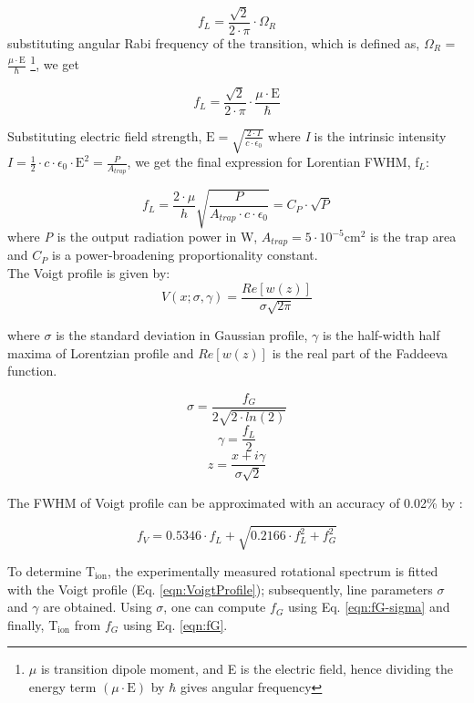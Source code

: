 \[ f_L = \frac{\sqrt{2}}{2 \cdot \pi} \cdot \Omega _R \]
substituting angular Rabi frequency of the transition, which is defined as, $\Omega _R$ = \( \frac{\mu \cdot \text{E}}{\hbar} \) \footnote{$\mu$ is transition dipole moment, and E is the electric field, hence dividing the energy term $(\mu \cdot \text{E})$ by $\hbar$ gives angular frequency}, we get

\[ f_L = \frac{\sqrt{2}}{2 \cdot \pi} \cdot \frac{\mu \cdot \text{E}}{\hbar} \]

Substituting electric field strength, 
\( \text{E} = \sqrt{\frac{2\cdot I}{c \cdot \epsilon _0}} \)
where \emph{I} is the intrinsic intensity 
\( I = \frac{1}{2} \cdot c \cdot \epsilon _0 \cdot \text{E}^2 = \frac{P}{A_{trap}} \), 
we get the final expression for Lorentian FWHM, f$_L$:

\begin{equation}
    f_L = \frac{2\cdot \mu}{h} \sqrt{\frac{P}{A_{trap} \cdot c \cdot \epsilon _0 }} = C_P \cdot \sqrt{P}
    \label{eqn:fL}
\end{equation}
where \emph{P} is the output radiation power in W, $A_{trap} = 5 \cdot 10^{-5} $cm$^2$ is the trap area and $C_P$ is a power-broadening proportionality constant.\\

The Voigt profile is given by: 
\begin{equation}
    V(x; \sigma, \gamma) = \frac{Re[w(z)]}{\sigma \sqrt{2\pi}}
    \label{eqn:VoigtProfile}
\end{equation}

where $\sigma$ is the standard deviation in Gaussian profile, $\gamma$ is the half-width half maxima of Lorentzian profile and $Re[w(z)]$ is the real part of the Faddeeva function.

\begin{equation}
    \sigma = \frac{f_G}{2\sqrt{2\cdot ln(2)}}
    \label{eqn:fG-sigma}
\end{equation}
\begin{equation}
    \gamma = \frac{f_L}{2}
    \label{eqn:fL-gamma}
\end{equation}
\[ z = \frac{x + i\gamma}{\sigma \sqrt{2}} \]

The FWHM of Voigt profile can be approximated  with an accuracy of 0.02\% by \cite{olivero_empirical_1977}:

\begin{equation}
    f_V = 0.5346 \cdot f_L + \sqrt{0.2166 \cdot f_L^2 + f_G^2}
    \label{eqn:fV}
\end{equation}

To determine T$_{\text{ion}}$, the experimentally measured rotational spectrum is fitted with the Voigt profile (Eq. \ref{eqn:VoigtProfile}); subsequently, line parameters $\sigma$ and $\gamma$ are obtained. Using $\sigma$, one can compute $f_G$ using Eq. \ref{eqn:fG-sigma} and finally, T$_{\text{ion}}$ from $f_G$ using Eq. \ref{eqn:fG}.
